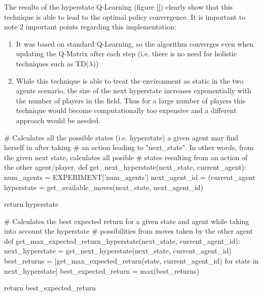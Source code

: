\documentclass[10pt]{article}
\begin{document}
    The results of the hyperstate Q-Learning (figure \ref{}) clearly show that this technique is able to lead to the optimal policy convergence. It is important to note 2 important points regarding this implementation:
    \begin{enumerate}[1)]
        \item It was based on standard Q-Learning, so the algorithm converges even when updating the Q-Matrix after each step (i.e. there is no need for holistic techniques such as TD($\lambda$))
        \item While this technique is able to treat the environment as static in the two agents scenario, the size of the next hyperstate increases exponentially with the number of players in the field. Thus for a large number of players this technique would become computationally too expensive and a different approach would be needed.
    \end{enumerate}

    \begin{python}[t]
# Calculates all the possible states (i.e. hyperstate) a given agent may find herself in after taking
# an action leading to "next_state". In other words, from the given next state, calculates all posible
# states resulting from an action of the other agent/player.
def get_next_hyperstate(next_state, current_agent):
    num_agents = EXPERIMENT['num_agents']
    next_agent_id = (current_agent %
    hyperstate = get_available_moves(next_state, next_agent_id)

    return hyperstate

# Calculates the best expected return for a given state and agent while taking into account the hyperstate
# possibilities from moves taken by the other agent
def get_max_expected_return_hyperstate(next_state, current_agent_id):
    next_hyperstate = get_next_hyperstate(next_state, current_agent_id)
    best_returns = [get_max_expected_return(state, current_agent_id) for state in next_hyperstate]
    best_expected_return = max(best_returns)

    return best_expected_return
    \end{python}
    \begin{lstlisting}[caption=Implementation code for Hyperstate - Best expected return calculation, label=lst:hyperstate]
    \end{lstlisting}
\end{document}

